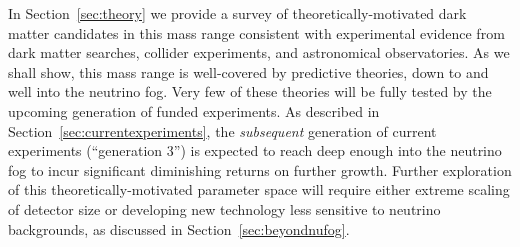 In Section~\ref{sec:theory} we provide a survey of theoretically-motivated dark matter candidates in this mass range consistent with experimental evidence from dark matter searches, collider experiments, and astronomical observatories. As we shall show, this mass range is well-covered by predictive theories, down to and well into the neutrino fog. Very few of these theories will be fully tested by the upcoming generation of funded experiments. As described in Section~\ref{sec:currentexperiments}, the \textit{subsequent} generation of current experiments (``generation 3'') is expected to reach deep enough into the neutrino fog to incur significant diminishing returns on further growth.  Further exploration of this theoretically-motivated parameter space will require either extreme scaling of detector size or developing new technology less sensitive to neutrino backgrounds, as discussed in Section~\ref{sec:beyondnufog}.


